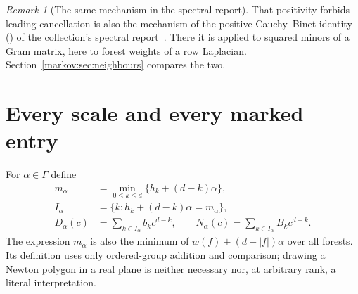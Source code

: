 \documentclass[11pt]{article}
\numberwithin{equation}{section}
\theoremstyle{definition}
\theoremstyle{remark}
\newtheorem{remark}[theorem]{Remark}
\begin{document}
\begin{remark}[The same mechanism in the spectral report]\label{markov:rem:gram}
That positivity forbids leading cancellation is also the mechanism of the
positive Cauchy--Binet identity () of the collection's spectral
report~\cite{CollSpec}. There it is applied to squared minors of a Gram matrix,
here to forest weights of a row Laplacian. Section~\ref{markov:sec:neighbours}
compares the two.
\end{remark}

\section{Every scale and every marked entry}\label{markov:sec:leading}

For $\alpha\in\Gamma$ define
\begin{align}
 m_\alpha&=\min_{0\le k\le d}\{h_k+(d-k)\alpha\},\label{markov:eq:m-alpha}\\
 I_\alpha&=\{k:h_k+(d-k)\alpha=m_\alpha\},\label{markov:eq:active}\\
 D_\alpha(c)&=\sum_{k\in I_\alpha}b_kc^{d-k},\qquad
 N_\alpha(c)=\sum_{k\in I_\alpha}B_kc^{d-k}.
 \label{markov:eq:initial-polynomials}
\end{align}
The expression $m_\alpha$ is also the minimum of
$w(f)+(d-|f|)\alpha$ over all forests. Its definition uses only ordered-group
addition and comparison; drawing a Newton polygon in a real plane is neither
necessary nor, at arbitrary rank, a literal interpretation.
\end{document}
